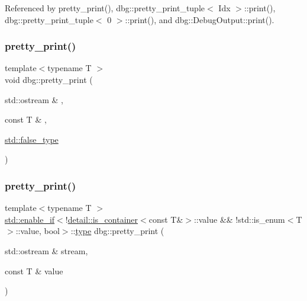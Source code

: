 Referenced by pretty\+\_\+print(), dbg\+::pretty\+\_\+print\+\_\+tuple$<$ Idx $>$\+::print(), dbg\+::pretty\+\_\+print\+\_\+tuple$<$ 0 $>$\+::print(), and dbg\+::\+Debug\+Output\+::print().

\mbox{\label{namespacedbg_ab875770941388a1d8279e9b5257e5a93}} 
\subsubsection{\texorpdfstring{pretty\+\_\+print()}{pretty\_print()}\hspace{0.1cm}{\footnotesize\ttfamily [2/19]}}
{\footnotesize\ttfamily template$<$typename T $>$ \\
void dbg\+::pretty\+\_\+print (\begin{DoxyParamCaption}\item[{std\+::ostream \&}]{,  }\item[{const T \&}]{,  }\item[{\hyperlink{namespacestd_aebe6729ab5488ecc76c762873d226857}{std\+::false\+\_\+type}}]{ }\end{DoxyParamCaption})\hspace{0.3cm}{\ttfamily [inline]}}

\mbox{\label{namespacedbg_a4920208faa7096e0333f9d14119a9c2f}} 
\subsubsection{\texorpdfstring{pretty\+\_\+print()}{pretty\_print()}\hspace{0.1cm}{\footnotesize\ttfamily [3/19]}}
{\footnotesize\ttfamily template$<$typename T $>$ \\
\hyperlink{structstd_1_1enable__if}{std\+::enable\+\_\+if}$<$!\hyperlink{structdbg_1_1detail_1_1is__container}{detail\+::is\+\_\+container}$<$const T\&$>$\+::value \&\& !std\+::is\+\_\+enum$<$T$>$\+::value, bool$>$\+::\hyperlink{namespacedbg_a2365d80e3a3525e6025040383ff8661b}{type} dbg\+::pretty\+\_\+print (\begin{DoxyParamCaption}\item[{std\+::ostream \&}]{stream,  }\item[{const T \&}]{value }\end{DoxyParamCaption})\hspace{0.3cm}{\ttfamily [inline]}}


